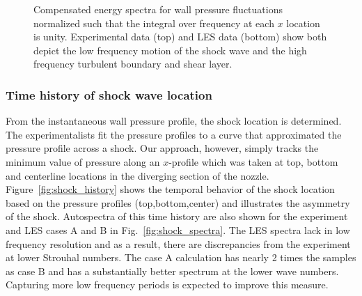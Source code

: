 \documentclass[]{aiaa-tc}%
\begin{document}
\begin{figure}[!h]
	\caption{ Compensated energy spectra for wall pressure fluctuations normalized such that the integral over frequency at each $x$ location is unity.  Experimental data (top) and LES data (bottom) show both depict the low frequency motion of the shock wave and the high frequency turbulent boundary and shear layer.
	}
\end{figure}



\subsubsection{Time history of shock wave location }

From the instantaneous wall pressure profile, the shock location is determined.  The experimentalists fit the pressure profiles to a curve that approximated the pressure profile across a shock.  Our approach, however, simply tracks the minimum value of pressure along an $x$-profile which was taken at top, bottom and centerline locations in the diverging section of the nozzle.  Figure~\ref{fig:shock_history} shows the temporal behavior of the shock location based on the pressure profiles (top,bottom,center) and illustrates the asymmetry of the shock.  Autospectra of this time history are also shown for the experiment and LES cases A and B in Fig.~\ref{fig:shock_spectra}.  The LES spectra lack in low frequency resolution and as a result, there are discrepancies from the experiment at lower Strouhal numbers.  The case A calculation has nearly 2 times the samples as case B and has a substantially better spectrum at the lower wave numbers.  Capturing more low frequency periods is expected to improve this measure.  
\end{document}
